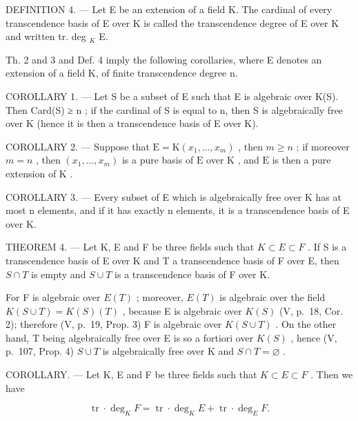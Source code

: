 DEFINITION 4. --- Let E be an extension of a field K. The cardinal of every transcendence basis of E over K is called the transcendence degree of E over K and written tr. deg \(_{K}\) E.

Th. 2 and 3 and Def. 4 imply the following corollaries, where E denotes an extension of a field K, of finite transcendence degree n.

COROLLARY 1. --- Let S be a subset of E such that E is algebraic over K(S). Then Card(S) ≥ n ; if the cardinal of S is equal to n, then S is algebraically free over K (hence it is then a transcendence basis of E over K).

COROLLARY 2. --- Suppose that \(\mathrm{E} = \mathrm{K}(x_1, \ldots, x_m)\) , then \(m \geqslant n\) ; if moreover \(m = n\) , then \((x_1, \ldots, x_m)\) is a pure basis of \(\mathrm{E}\) over \(\mathrm{K}\) , and \(\mathrm{E}\) is then a pure extension of \(\mathrm{K}\) .

COROLLARY 3. --- Every subset of E which is algebraically free over K has at most n elements, and if it has exactly n elements, it is a transcendence basis of E over K.

THEOREM 4. --- Let K, E and F be three fields such that \(K \subset E \subset F\) . If S is a transcendence basis of E over K and T a transcendence basis of F over E, then \(S \cap T\) is empty and \(S \cup T\) is a transcendence basis of F over K.

For F is algebraic over \(E(T)\) ; moreover, \(E(T)\) is algebraic over the field \(K(S \cup T) = K(S)(T)\) , because E is algebraic over \(K(S)\) (V, p.~18, Cor. 2); therefore (V, p.~19, Prop. 3) F is algebraic over \(K(S \cup T)\) . On the other hand, T being algebraically free over E is so a fortiori over \(K(S)\) , hence (V, p.~107, Prop. 4) \(S \cup T\) is algebraically free over K and \(S \cap T = \varnothing\) .

COROLLARY. --- Let K, E and F be three fields such that \(K \subset E \subset F\) . Then we have

\[
\operatorname{tr} \cdot \deg_ {K} F = \operatorname{tr} \cdot \deg_ {K} E + \operatorname{tr} \cdot \deg_ {E} F.\tag{1}
\]

